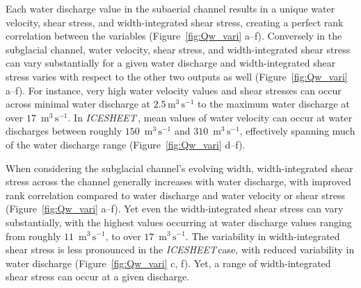 \documentclass[11pt]{article}
\newcommand{\icesheet}{\textit{ICESHEET}\,}
\newcommand{\unit}[1]{$\mathrm{#1}$}
\begin{document}
Each water discharge value in the subaerial channel results in a unique water velocity, shear stress, and width-integrated shear stress, creating a perfect rank correlation between the variables (Figure~\ref{fig:Qw_vari} a--f).
Conversely in the subglacial channel,  water velocity, shear stress, and width-integrated shear stress can vary substantially for a given water discharge and width-integrated shear stress varies with respect to the other two  outputs as well (Figure~\ref{fig:Qw_vari} a--f).
For instance, very high  water velocity values and shear stresses can occur across minimal water discharge at $2.5$\,\unit{m}$^3$\,\unit{s}$^{-1}$ to the maximum water discharge at over $17$ \,\unit{m}$^3$\,\unit{s}$^{-1}$.
In \icesheet, mean values of water velocity can occur at water discharges between roughly $150$ \,\unit{m}$^3$\,\unit{s}$^{-1}$ and $310$ \,\unit{m}$^3$\,\unit{s}$^{-1}$, effectively spanning much of the water discharge range (Figure~\ref{fig:Qw_vari} d--f).

When considering the subglacial channel's evolving width, width-integrated shear stress  across the channel generally increases with water discharge, with improved rank correlation compared to water discharge and water velocity or shear stress (Figure~\ref{fig:Qw_vari} a--f).
Yet even the width-integrated shear stress  can vary substantially, with the highest values occurring at water discharge values ranging from roughly $11$ \,\unit{m}$^3$\,\unit{s}$^{-1}$, to over $17$ \,\unit{m}$^3$\,\unit{s}$^{-1}$.
The variability in width-integrated shear stress is less pronounced in the \icesheet case, with reduced variability in water discharge (Figure~\ref{fig:Qw_vari} c, f).
Yet, a range of width-integrated shear stress can occur at a given discharge.
\end{document}
